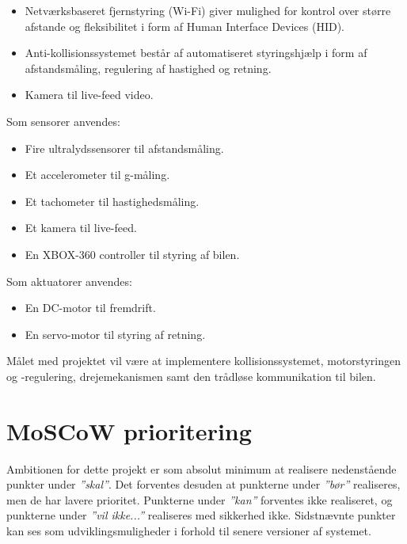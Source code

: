 \begin{itemize}\itemsep1pt \parskip0pt 
	\item Netværksbaseret fjernstyring (Wi-Fi) giver mulighed for kontrol over større afstande og fleksibilitet i form af Human Interface Devices (HID).
	\item Anti-kollisionssystemet består af automatiseret styringshjælp i form af
afstandsmåling, regulering af hastighed og retning.
	\item Kamera til live-feed video.
\end{itemize}

Som sensorer anvendes:

\begin{itemize}\itemsep1pt \parskip0pt 
	\item Fire ultralydssensorer til afstandsmåling.
	\item Et accelerometer til g-måling.
	\item Et tachometer til hastighedsmåling.
	\item Et kamera til live-feed.
	\item En XBOX-360 controller til styring af bilen.
\end{itemize}

Som aktuatorer anvendes:

\begin{itemize}\itemsep1pt \parskip0pt 
	\item En DC-motor til fremdrift.
	\item En servo-motor til styring af retning.
\end{itemize}

Målet med projektet vil være at implementere  kollisionssystemet, motorstyringen og -regulering, drejemekanismen samt den trådløse kommunikation til bilen.

\clearpage


\section*{MoSCoW prioritering} \label{sec:moscow_prioritering}

Ambitionen for dette projekt er som absolut minimum at realisere nedenstående punkter under \textit{''skal''}. 
Det forventes desuden at punkterne under \textit{''bør''} realiseres, men de har lavere prioritet.
Punkterne under \textit{''kan''} forventes ikke realiseret, og punkterne under \textit{''vil ikke...''} realiseres med sikkerhed ikke. 
Sidstnævnte punkter kan ses som udviklingsmuligheder i forhold til senere versioner af systemet. 

